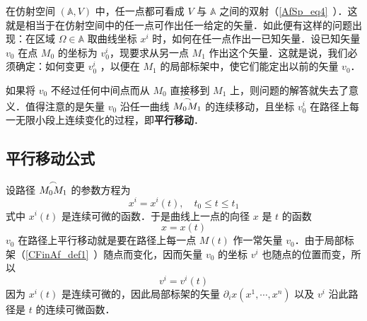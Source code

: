 


在仿射空间 $(\mathbb A,V)$ 中，任一点都可看成 $V$ 与 $\mathbb A$ 之间的双射（\autoref{AfSp_eq4}~）．这就是相当于在仿射空间中的任一点可作出任一给定的矢量．如此便有这样的问题出现：在区域 $\Omega\in\mathbb A$ 取曲线坐标 $x^i$ 时，如何在任一点作出一已知矢量．设已知矢量 $v_0$ 在点 $M_0$ 的坐标为 $v_0^i$，现要求从另一点 $M_1$ 作出这个矢量．这就是说，我们必须确定：如何变更 $v_0^i$ ，以便在 $M_1$ 的局部标架中，使它们能定出以前的矢量 $v_0$．

如果将 $v_0$ 不经过任何中间点而从 $M_0$ 直接移到 $M_1$ 上，则问题的解答就失去了意义．值得注意的是矢量 $v_0$ 沿任一曲线 $\overset{\Huge\frown}{M_0M_1}$ 的连续移动，且坐标 $v_0^i$ 在路径上每一无限小段上连续变化的过程，即\textbf{平行移动}．
\subsection{平行移动公式}
设路径 $\overset{\Huge\frown}{M_0M_1}$ 的参数方程为
\begin{equation}
x^i=x^i(t),\quad t_0\leq t\leq t_1
\end{equation}
式中 $x^i(t)$ 是连续可微的函数．于是曲线上一点的向径 $x$ 是 $t$ 的函数
\begin{equation}
x=x(t)
\end{equation}
$v_0$ 在路径上平行移动就是要在路径上每一点 $M(t)$ 作一常矢量 $v_0$．由于局部标架（\autoref{CFinAf_def1}~）随点而变化，因而矢量 $v_0$ 的坐标 $v^i$ 也随点的位置而变，所以
\begin{equation}
v^i=v^i(t)
\end{equation}
因为 $x^i(t)$ 是连续可微的，因此局部标架的矢量 $\partial_i x(x^1,\cdots,x^n)$ 以及 $v^i$ 沿此路径是 $t$ 的连续可微函数．

